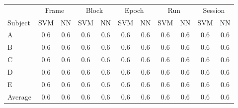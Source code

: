 \begin{tabular}{l *{10}{c}}
\toprule
& \multicolumn{2}{c}{Frame} & \multicolumn{2}{c}{Block} & \multicolumn{2}{c}{Epoch} & \multicolumn{2}{c}{Run} & \multicolumn{2}{c}{Session} \\
\cmidrule(lr){2-3} \cmidrule(rl){4-5} \cmidrule(rl){6-7} \cmidrule(rl){8-9} \cmidrule(l){10-11}
Subject	& SVM & NN & SVM & NN & SVM & NN & SVM & NN & SVM & NN \\
\midrule
A		& 0.6 & 0.6 & 0.6 & 0.6 & 0.6 & 0.6 & 0.6 & 0.6 & 0.6 & 0.6 \\
B		& 0.6 & 0.6 & 0.6 & 0.6 & 0.6 & 0.6 & 0.6 & 0.6 & 0.6 & 0.6 \\
C		& 0.6 & 0.6 & 0.6 & 0.6 & 0.6 & 0.6 & 0.6 & 0.6 & 0.6 & 0.6 \\
D		& 0.6 & 0.6 & 0.6 & 0.6 & 0.6 & 0.6 & 0.6 & 0.6 & 0.6 & 0.6 \\
E		& 0.6 & 0.6 & 0.6 & 0.6 & 0.6 & 0.6 & 0.6 & 0.6 & 0.6 & 0.6 \\
Average	& 0.6 & 0.6 & 0.6 & 0.6 & 0.6 & 0.6 & 0.6 & 0.6 & 0.6 & 0.6 \\
\bottomrule 
\end{tabular}